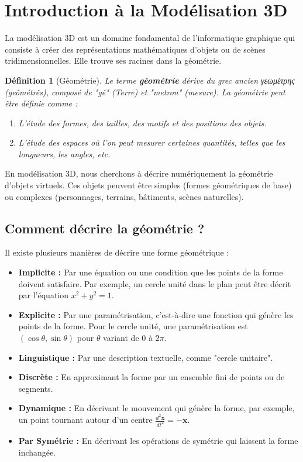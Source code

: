 \documentclass{article}
\newtheorem{definition}{Définition}
\begin{document}
\sloppy

\section{Introduction à la Modélisation 3D}

La modélisation 3D est un domaine fondamental de l'informatique graphique qui consiste à créer des représentations mathématiques d'objets ou de scènes tridimensionnelles. Elle trouve ses racines dans la géométrie.

\begin{definition}[Géométrie]
Le terme \textbf{géométrie} dérive du grec ancien γεωμέτρης (geômétrês), composé de "gê" (Terre) et "metron" (mesure). La géométrie peut être définie comme :
\begin{enumerate}
    \item L'étude des formes, des tailles, des motifs et des positions des objets.
    \item L'étude des espaces où l'on peut mesurer certaines quantités, telles que les longueurs, les angles, etc.
\end{enumerate}
\end{definition}

En modélisation 3D, nous cherchons à décrire numériquement la géométrie d'objets virtuels. Ces objets peuvent être simples (formes géométriques de base) ou complexes (personnages, terrains, bâtiments, scènes naturelles).

\subsection{Comment décrire la géométrie ?}
Il existe plusieurs manières de décrire une forme géométrique :
\begin{itemize}
    \item \textbf{Implicite :} Par une équation ou une condition que les points de la forme doivent satisfaire. Par exemple, un cercle unité dans le plan peut être décrit par l'équation $x^2 + y^2 = 1$.
    \item \textbf{Explicite :} Par une paramétrisation, c'est-à-dire une fonction qui génère les points de la forme. Pour le cercle unité, une paramétrisation est $(\cos\theta, \sin\theta)$ pour $\theta$ variant de 0 à $2\pi$.
    \item \textbf{Linguistique :} Par une description textuelle, comme "cercle unitaire".
    \item \textbf{Discrète :} En approximant la forme par un ensemble fini de points ou de segments.
    \item \textbf{Dynamique :} En décrivant le mouvement qui génère la forme, par exemple, un point tournant autour d'un centre $\frac{d^2\mathbf{x}}{dt^2} = -\mathbf{x}$.
    \item \textbf{Par Symétrie :} En décrivant les opérations de symétrie qui laissent la forme inchangée.
\end{itemize}
\end{document}
